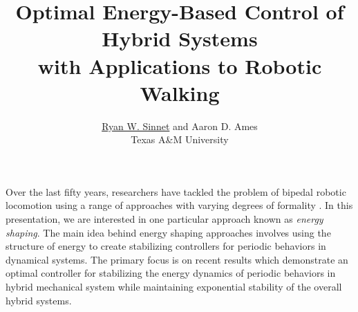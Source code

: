 \documentclass[english]{article}
\begin{document}

\title{Optimal Energy-Based Control of Hybrid Systems\\ with Applications to
  Robotic Walking}

\author{\underline{Ryan W. Sinnet} and Aaron D. Ames \\
  Texas A\&M University}%


\date{}
\maketitle
\thispagestyle{empty}

Over the last fifty years, researchers have tackled the problem of bipedal
robotic locomotion using a range of approaches with varying degrees of
formality \cite{Grizzle2014}.
%
In this presentation, we are interested in one particular approach known as {\em
  energy shaping}.
%
The main idea behind energy shaping approaches involves using the structure
of energy to create stabilizing controllers for periodic behaviors in dynamical
systems.
%
The primary focus is on recent results \cite{Sinnet2015,Sinnet2015a} which
demonstrate an optimal controller for stabilizing the energy dynamics of
periodic behaviors in hybrid mechanical system while maintaining exponential
stability of the overall hybrid systems.
\end{document}
